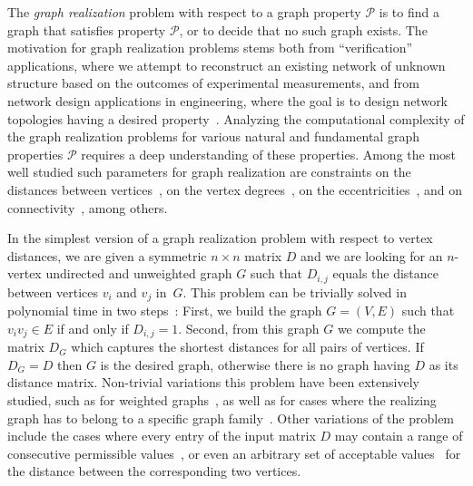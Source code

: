\documentclass[a4paper,UKenglish,cleveref, autoref, thm-restate,anonymous]{lipics-v2021}
\begin{document}
The \emph{graph realization} problem with respect to a graph property $\mathcal{P}$ is to find a graph that satisfies property $\mathcal{P}$, or to decide that no such graph exists. 
The motivation for graph realization problems stems both from ``verification'' applications, 
where we attempt to reconstruct an existing network of unknown structure based on the outcomes of experimental measurements, 
and from network design applications in engineering, where the goal is to design network topologies having a desired property~\cite{augustine2022distributed,grotschel1995design}.
Analyzing the computational complexity of the graph realization problems for various natural and fundamental graph properties $\mathcal{P}$ requires a deep understanding of these properties.
Among the most well studied such parameters for graph realization 
are constraints on the distances between vertices~\cite{barNoy2022GraphRealization,barNoy2021composed,hakimi1965distance,chung2001distance,bixby1988almost,culberson1989fast}, 
on the vertex degrees~\cite{GolovachM17,gomory1961multi,hakimi1962realizability,Bar-NoyCPR20,erdos1960graphs}, 
on the eccentricities~\cite{barNoy2020efficiently,hell2009linear,behzad1976eccentric,lesniak1975eccentric}, and on connectivity~\cite{fulkerson1960zero,frank1992augmenting,chen1966realization,frank1994connectivity,frank1970connectivity,gomory1961multi}, among others. 


In the simplest version of a graph realization problem with respect to vertex distances, 
we are given a symmetric $n \times n$ matrix $D$ and we are looking for an $n$-vertex undirected and unweighted graph $G$ such that $D_{i,j}$ equals the distance between vertices $v_i$ and $v_j$ in~$G$. This problem can be trivially solved in polynomial time in two steps~\cite{hakimi1965distance}: First, we build the graph $G=(V,E)$ such that $v_i v_j \in E$ if and only if $D_{i,j}=1$. Second, from this graph $G$ we compute the matrix $D_G$ which captures the shortest distances for all pairs of vertices. If $D_G = D$ then $G$ is the desired graph, otherwise there is no graph having $D$ as its distance matrix. 
Non-trivial variations this problem have been extensively studied, such as for weighted graphs~\cite{hakimi1965distance,Patrinos-Hakimi-72}, as well as for cases where the realizing graph has to belong to a specific graph family~\cite{hakimi1965distance, barNoy2021composed}. Other variations of the problem include the cases where every entry of the input matrix $D$ may contain a range of consecutive permissible values~\cite{barNoy2021composed,Rubei16,Tamura93}, or even an arbitrary set of acceptable values~\cite{barNoy2022GraphRealization} for the distance between the corresponding two vertices. 
\end{document}
